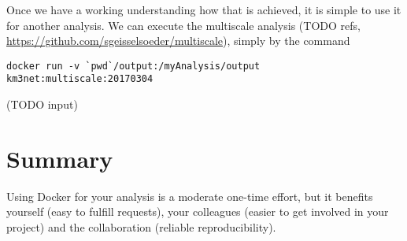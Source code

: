 \documentclass[a4paper, twoside, 11pt]{article}
\begin{document}
Once we have a working understanding how that is achieved, 
it is simple to use it for another analysis. 
We can execute the multiscale analysis (TODO refs, \url{https://github.com/sgeisselsoeder/multiscale}), simply by the command 
\begin{lstlisting}[basicstyle=\footnotesize\ttfamily,frame=single]
docker run -v `pwd`/output:/myAnalysis/output km3net:multiscale:20170304
\end{lstlisting}
(TODO input)

\section{Summary}

Using Docker for your analysis is a moderate one-time effort, 
but it benefits yourself (easy to fulfill requests), 
your colleagues (easier to get involved in your project) 
and the collaboration (reliable reproducibility).
\end{document}
